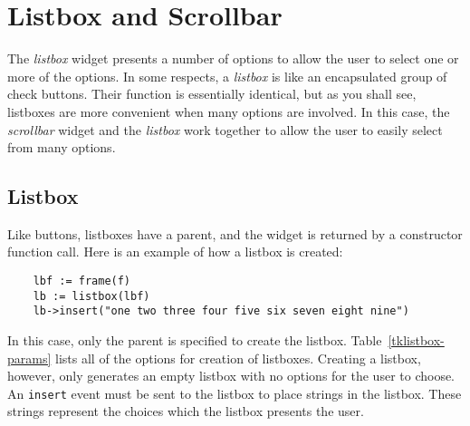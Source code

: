 \section{Listbox and Scrollbar}
The {\em listbox} widget presents a number of options to allow the user to select
one or more of the options. In some respects, a {\em listbox} is like an
encapsulated group of check buttons. Their function is essentially identical, but
as you shall see, listboxes are more convenient when many options are involved. In
this case, the {\em scrollbar} widget and the {\em listbox} 
work together to allow
the user to easily select from many options.

\subsection{Listbox}
Like buttons, listboxes
have a parent, and the widget is returned by a constructor function call. Here is an
example of how a listbox is created:
\begin{verbatim}
    lbf := frame(f)
    lb := listbox(lbf)
    lb->insert("one two three four five six seven eight nine")
\end{verbatim}
In this case, only the parent is specified to create the listbox.
Table~\ref{tklistbox-params} lists all of the options for creation of listboxes.
Creating a listbox, however, only generates an empty listbox with
no options for the user to choose. An {\tt insert} event must be sent to the
listbox to place strings in the listbox. These strings represent
the choices which the listbox presents the user.

